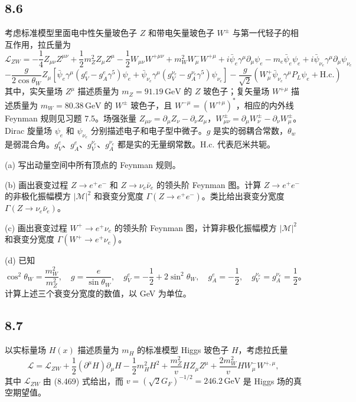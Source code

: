 \subsection{8.6}
考虑标准模型里面电中性矢量玻色子 $Z$ 和带电矢量玻色子 $W^{\pm}$ 与第一代轻子的相互作用，拉氏量为
$$
\mathcal{L}_{ZW} = -\frac{1}{4} Z_{\mu \nu} Z^{\mu \nu} + \frac{1}{2} m_Z^2 Z_{\mu} Z^{\mu} - \frac{1}{2} W_{\mu \nu} W^{+ \mu \nu} + m_W^2 W_{\mu}^{-} W^{+ \mu} + i \bar{\psi}_e \gamma^\mu \partial_\mu \psi_e - m_e \bar{\psi}_e \psi_e + i \bar{\psi}_{\nu_e} \gamma^\mu \partial_\mu \psi_{\nu_e}
$$
$$
- \frac{g}{2 \cos \theta_W} Z_{\mu} [\bar{\psi}_e \gamma^\mu (g_V^e - g_A^e \gamma^5) \psi_e + \bar{\psi}_{\nu_e} \gamma^\mu (g_V^{\nu_e} - g_A^{\nu_e} \gamma^5) \psi_{\nu_e}] - \frac{g}{\sqrt{2}} (W_{\mu}^+ \bar{\psi}_{\nu_e} \gamma^\mu P_L \psi_e + \text{H.c.})
$$
其中，实矢量场 $Z^{\mu}$ 描述质量为 $m_Z = 91.19 \, \text{GeV}$ 的 $Z$ 玻色子；复矢量场 $W^{+ \mu}$ 描述质量为 $m_W = 80.38 \, \text{GeV}$ 的 $W^{\pm}$ 玻色子，且 $W^{- \mu} = (W^{+ \mu})^*$，相应的内外线 Feynman 规则见习题 7.5。场强张量 $Z_{\mu \nu} = \partial_\mu Z_{\nu} - \partial_\nu Z_{\mu}$，$W_{\mu\nu}^{\pm} = \partial_\mu W_{\nu}^{\pm} - \partial_\nu W_{\mu}^{\pm}$。Dirac 旋量场 $\psi_e$ 和 $\psi_{\nu_e}$ 分别描述电子和电子型中微子。$g$ 是实的弱耦合常数，$\theta_w$ 是弱混合角。$g_V^e$、$g_A^e$、$g_V^{\nu_e}$、$g_A^{\nu_e}$ 都是实的无量纲常数。H.c. 代表厄米共轭。

(a) 写出动量空间中所有顶点的 Feynman 规则。

(b) 画出衰变过程 $Z \to e^+ e^-$ 和 $Z \to \nu_e \bar{\nu}_e$ 的领头阶 Feynman 图。计算 $Z \to e^+ e^-$ 的非极化振幅模方 $|\mathcal{M}|^2$ 和衰变分宽度 $\Gamma (Z \to e^+ e^-)$。类比给出衰变分宽度 $\Gamma (Z \to \nu_e \bar{\nu}_e)$。

(c) 画出衰变过程 $W^+ \to e^+ \nu_e$ 的领头阶 Feynman 图，计算非极化振幅模方 $|\mathcal{M}|^2$ 和衰变分宽度 $\Gamma (W^+ \to e^+ \nu_e)$。

(d) 已知
$$
\cos^2 \theta_W = \frac{m_W^2}{m_Z^2}, \quad g = \frac{e}{\sin \theta_W}, \quad g_V^e = -\frac{1}{2} + 2 \sin^2 \theta_W, \quad g_A^e = -\frac{1}{2}, \quad g_V^{\nu_e} = g_A^{\nu_e} = \frac{1}{2}。
$$
计算上述三个衰变分宽度的数值，以 GeV 为单位。

\newpage
\subsection{8.7}
以实标量场 $H(x)$ 描述质量为 $m_H$ 的标准模型 Higgs 玻色子 $H$，考虑拉氏量
$$
\mathcal{L} = \mathcal{L}_{ZW} + \frac{1}{2} (\partial^\mu H) \partial_\mu H - \frac{1}{2} m_H^2 H^2 + \frac{m_Z^2}{v} H Z_\mu Z^\mu + \frac{2m_W^2}{v} H W_\mu^{-} W^{+,\mu},
$$
其中 $\mathcal{L}_{ZW}$ 由 (8.469) 式给出，而 $v = (\sqrt{2} G_F)^{-1/2} = 246.2 \, \text{GeV}$ 是 Higgs 场的真空期望值。


